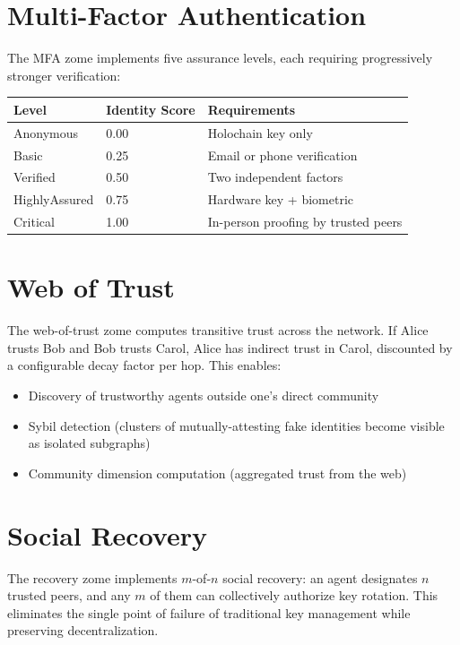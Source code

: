 \documentclass[12pt]{book}
\begin{document}
\section{Multi-Factor Authentication}

The MFA zome implements five assurance levels, each requiring progressively
stronger verification:

\begin{longtable}{lll}
\toprule
\textbf{Level} & \textbf{Identity Score} & \textbf{Requirements} \\
\midrule
Anonymous & 0.00 & Holochain key only \\
Basic & 0.25 & Email or phone verification \\
Verified & 0.50 & Two independent factors \\
HighlyAssured & 0.75 & Hardware key + biometric \\
Critical & 1.00 & In-person proofing by trusted peers \\
\bottomrule
\end{longtable}

\section{Web of Trust}

The web-of-trust zome computes transitive trust across the network. If Alice
trusts Bob and Bob trusts Carol, Alice has indirect trust in Carol, discounted
by a configurable decay factor per hop. This enables:

\begin{itemize}
  \item Discovery of trustworthy agents outside one's direct community
  \item Sybil detection (clusters of mutually-attesting fake identities become
    visible as isolated subgraphs)
  \item Community dimension computation (aggregated trust from the web)
\end{itemize}

\section{Social Recovery}

The recovery zome implements $m$-of-$n$ social recovery: an agent designates
$n$ trusted peers, and any $m$ of them can collectively authorize key rotation.
This eliminates the single point of failure of traditional key management
while preserving decentralization.
\end{document}
